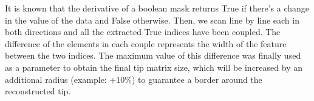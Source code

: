 It is known that the derivative of a boolean mask returns True if there's a change in the value of the data and False otherwise. Then, we scan line by line each in both directions and all the extracted True indices have been coupled. The difference of the elements in each couple represents the width of the feature between the two indices. The maximum value of this difference was finally used as a parameter to obtain the final tip matrix size, which will be increased by an additional radius (example: +10\%) to guarantee a border around the reconstructed tip.